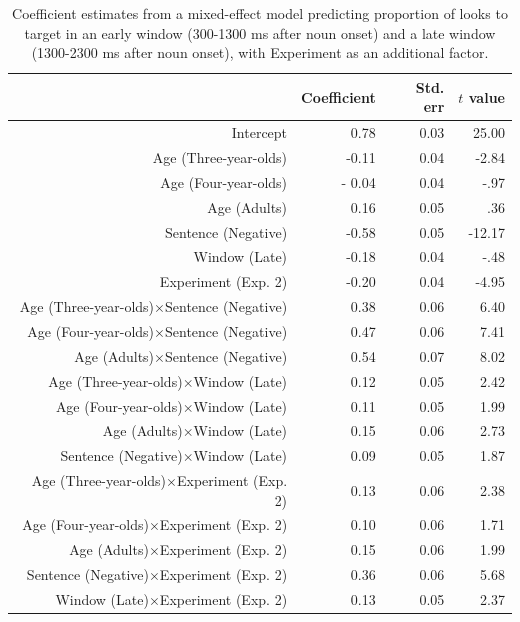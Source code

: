 \documentclass[man]{apa2}
\begin{document}
\begin{table}
\label{tab:bothmodel}
\caption{Coefficient estimates from a mixed-effect model predicting proportion of looks to target in an early window (300-1300 ms after noun onset) and a late window (1300-2300 ms after noun onset), with Experiment as an additional factor.}

\begin{center}
\small\addtolength{\tabcolsep}{-5pt}
\begin{tabular}{rrrr}
  \hline
 & Coefficient  & Std. err & $t$ value \\ 
  \hline
Intercept & 0.78 & 0.03 & 25.00 \\ 
  Age (Three-year-olds) & -0.11 & 0.04 & -2.84 \\ 
  Age (Four-year-olds)&- 0.04 & 0.04 &  -.97\\ 
  Age (Adults) & 0.16 & 0.05 & .36 \\ 
  Sentence (Negative) & -0.58 & 0.05 & -12.17 \\ 
  Window (Late)  & -0.18 & 0.04 & -.48 \\ 
  Experiment (Exp. 2) & -0.20 & 0.04 & -4.95 \\ 
  Age (Three-year-olds)$\times$Sentence (Negative) & 0.38 & 0.06 & 6.40 \\ 
  Age (Four-year-olds)$\times$Sentence (Negative) & 0.47 & 0.06 & 7.41 \\ 
  Age (Adults)$\times$Sentence (Negative) & 0.54 & 0.07 & 8.02 \\ 
  Age (Three-year-olds)$\times$Window (Late)  & 0.12 & 0.05 & 2.42 \\ 
  Age (Four-year-olds)$\times$Window (Late) & 0.11 & 0.05 & 1.99 \\ 
  Age (Adults)$\times$Window (Late)  & 0.15 & 0.06 & 2.73 \\ 
  Sentence (Negative)$\times$Window (Late)  & 0.09 & 0.05 & 1.87 \\ 
  Age (Three-year-olds)$\times$Experiment (Exp. 2)  & 0.13 & 0.06 & 2.38 \\ 
  Age (Four-year-olds)$\times$Experiment (Exp. 2)  & 0.10 & 0.06 & 1.71 \\ 
  Age (Adults)$\times$Experiment (Exp. 2) & 0.15 & 0.06 & 1.99 \\ 
  Sentence (Negative)$\times$Experiment (Exp. 2)& 0.36 & 0.06 & 5.68 \\ 
  Window (Late)$\times$Experiment (Exp. 2)  & 0.13 & 0.05 & 2.37 \\ 

\end{tabular}
\end{center}
\end{table}
\end{document}
